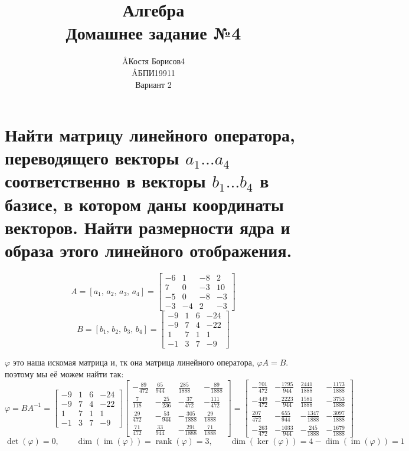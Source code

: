 \documentclass{article}
\title{Алгебра \\ Домашнее задание №4}
\author{\AA{Костя Борисов}{4} \\ \AA{БПИ199}{11} \\ Вариант 2}
\renewcommand{\f}{\frac}
\renewcommand{\l}{\left}
\renewcommand{\r}{\right}
\renewcommand{\phi}{\varphi}
\DeclareMathOperator{\rank}{rank}
\DeclareMathOperator{\im}{im}
\begin{document}
  \maketitle

  \section{Найти матрицу линейного оператора, переводящего векторы $a_1 \dots a_4$ соответственно в векторы $b_1 \dots b_4$ в базисе, в котором даны координаты векторов. Найти размерности ядра и образа этого линейного отображения.}
  $$A = \l[a_1,\, a_2,\, a_3,\, a_4\r] = \begin{bmatrix}-6&1&-8&2\\7&0&-3&10\\-5&0&-8&-3\\-3&-4&2&-3\end{bmatrix}$$
  $$B = \l[b_1,\, b_2,\, b_3,\, b_4\r] = \begin{bmatrix}-9&1&6&-24\\-9&7&4&-22\\1&7&1&1\\-1&3&7&-9\end{bmatrix}$$

  \noindent
  $\phi$ это наша искомая матрица и, тк она матрица линейного оператора, $\phi A = B$.
  поэтому мы её можем найти так:
  $$\phi = BA^{-1} = \begin{bmatrix}-9&1&6&-24\\-9&7&4&-22\\1&7&1&1\\-1&3&7&-9\end{bmatrix} \begin{bmatrix}- \f{89}{472} & \f{65}{944} & \frac{285}{1888} & - \f{89}{1888}\\\f{7}{118} & - \f{25}{236} & - \f{37}{472} & - \f{111}{472}\\\f{29}{472} & - \f{53}{944} & - \f{305}{1888} & \f{29}{1888}\\\f{71}{472} & \f{33}{944} & - \f{291}{1888} & \f{71}{1888}\end{bmatrix} = \begin{bmatrix}- \f{701}{472} & - \f{1795}{944} & \f{2441}{1888} & - \f{1173}{1888}\\- \f{449}{472} & - \f{2223}{944} & \f{1581}{1888} & - \f{3753}{1888}\\\f{207}{472} & - \f{655}{944} & - \f{1347}{1888} & - \f{3097}{1888}\\- \f{263}{472} & - \f{1033}{944} & - \f{245}{1888} & - \f{1679}{1888}\end{bmatrix}$$
  $$\det(\phi) = 0, \qquad \dim(\im(\phi))=\rank(\phi) = 3, \qquad \dim(\ker(\phi))=4-\dim(\im(\phi))=1$$
\end{document}
